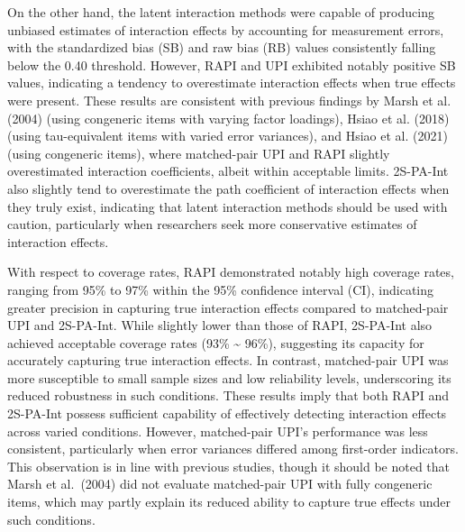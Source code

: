 \documentclass[
  man]{apa6}
\begin{document}
On the other hand, the latent interaction methods were capable of producing unbiased estimates of interaction effects by accounting for measurement errors, with the standardized bias (SB) and raw bias (RB) values consistently falling below the 0.40 threshold. However, RAPI and UPI exhibited notably positive SB values, indicating a tendency to overestimate interaction effects when true effects were present. These results are consistent with previous findings by Marsh et al. (2004) (using congeneric items with varying factor loadings), Hsiao et al. (2018) (using tau-equivalent items with varied error variances), and Hsiao et al. (2021) (using congeneric items), where matched-pair UPI and RAPI slightly overestimated interaction coefficients, albeit within acceptable limits. 2S-PA-Int also slightly tend to overestimate the path coefficient of interaction effects when they truly exist, indicating that latent interaction methods should be used with caution, particularly when researchers seek more conservative estimates of interaction effects.

With respect to coverage rates, RAPI demonstrated notably high coverage rates, ranging from 95\% to 97\% within the 95\% confidence interval (CI), indicating greater precision in capturing true interaction effects compared to matched-pair UPI and 2S-PA-Int. While slightly lower than those of RAPI, 2S-PA-Int also achieved acceptable coverage rates (93\% \textasciitilde{} 96\%), suggesting its capacity for accurately capturing true interaction effects. In contrast, matched-pair UPI was more susceptible to small sample sizes and low reliability levels, underscoring its reduced robustness in such conditions. These results imply that both RAPI and 2S-PA-Int possess sufficient capability of effectively detecting interaction effects across varied conditions. However, matched-pair UPI's performance was less consistent, particularly when error variances differed among first-order indicators. This observation is in line with previous studies, though it should be noted that Marsh et al.~(2004) did not evaluate matched-pair UPI with fully congeneric items, which may partly explain its reduced ability to capture true effects under such conditions.
\end{document}
